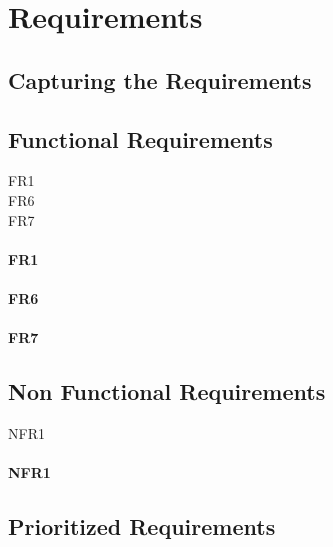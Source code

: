 
\chapter{Requirements}
\minitoc

\clearpage

\section{Capturing the Requirements}

\section{Functional Requirements}\label{section:functional-requirements}
\begin{description}
  \item[FR1]
  \item[FR6]
  \item[FR7]
\end{description}

\subsubsection{FR1}

\subsubsection{FR6}

\subsubsection{FR7}


\section{Non Functional Requirements}\label{section:non-functional-requirements}
\begin{description}
  \item[NFR1]
\end{description}

\subsubsection{NFR1}


\section{Prioritized Requirements}
